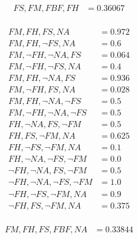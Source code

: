 \documentclass[12pt]{article}
\begin{document}
\begin{align*}
FS, FM, FBF, FH &= 0.36067 \\
\end{align*}


\newpage
\problemsub
\begin{align*}
FM, FH, FS, NA &= 0.972 \\
FM, FH, \lnot FS, NA &= 0.6 \\
FM, \lnot FH, \lnot NA, FS &= 0.064 \\
FM, \lnot FH, \lnot FS, NA &= 0.4 \\
FM, FH, \lnot NA, FS &= 0.936 \\
FM, \lnot FH, FS, NA &= 0.028 \\
FM, FH, \lnot NA, \lnot FS &= 0.5 \\
FM, \lnot FH, \lnot NA, \lnot FS &= 0.5 \\
FH, \lnot NA, FS, \lnot FM &= 0.5 \\
FH, FS, \lnot FM, NA &= 0.625 \\
FH, \lnot FS, \lnot FM, NA &= 0.1 \\
FH, \lnot NA, \lnot FS, \lnot FM &= 0.0 \\
\lnot FH, \lnot NA, FS, \lnot FM &= 0.5 \\
\lnot FH, \lnot NA, \lnot FS, \lnot FM &= 1.0 \\
\lnot FH, \lnot FS, \lnot FM, NA &= 0.9 \\
\lnot FH, FS, \lnot FM, NA &= 0.375 \\
\end{align*}

\begin{align*}
FM, FH, FS, FBF, NA &= 0.33844 \\
\end{align*}
\end{document}
